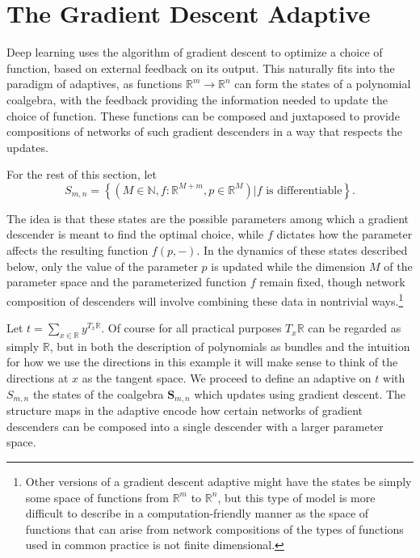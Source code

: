 \documentclass[11pt, one side, article]{memoir}
\theoremstyle{definition}
\theoremstyle{plain}
\newenvironment{definition}
  {\pushQED{\qed}\renewcommand{\qedsymbol}{$\lozenge$}\definitionx}
  {\popQED\enddefinitionx}
\newcommand{\Cat}[1]{\mathbf{#1}}%
\newcommand{\nn}{\mathbb{N}}
\newcommand{\rr}{\mathbb{R}}
\newcommand{\0}{\textsf{0}}
\newcommand{\1}{\tn{\textsf{1}}}
\renewcommand{\S}{{\Cat{S}}}
\begin{document}
\section{The Gradient Descent Adaptive}

Deep learning uses the algorithm of gradient descent to optimize a choice of function, based on external feedback on its output. This naturally fits into the paradigm of adaptives, as functions $\rr^m \to \rr^n$ can form the states of a polynomial coalgebra, with the feedback providing the information needed to update the choice of function. These functions can be composed and juxtaposed to provide compositions of networks of such gradient descenders in a way that respects the updates.

\begin{definition}
For the rest of this section, let 
\[S_{m,n} = \left\{(M \in \nn, f : \rr^{M+m}, p \in \rr^M) | f \textrm{ is differentiable}\right\}.
\]
\end{definition}

The idea is that these states are the possible parameters among which a gradient descender is meant to find the optimal choice, while $f$ dictates how the parameter affects the resulting function $f(p,-)$. In the dynamics of these states described below, only the value of the parameter $p$ is updated while the dimension $M$ of the parameter space and the parameterized function $f$ remain fixed, though network composition of descenders will involve combining these data in nontrivial ways.\footnote{Other versions of a gradient descent adaptive might have the states be simply some space of functions from $\rr^m$ to $\rr^n$, but this type of model is more difficult to describe in a computation-friendly manner as the space of functions that can arise from network compositions of the types of functions used in common practice is not finite dimensional.}%


Let $t = \sum_{x \in \rr} y^{T_x \rr}$.  Of course for all practical purposes $T_x \rr$ can be regarded as simply $\rr$, but in both the description of polynomials as bundles and the intuition for how we use the directions in this example it will make sense to think of the directions at $x$ as the tangent space. We proceed to define an adaptive on $t$ with $S_{m,n}$ the states of the coalgebra $\S_{m,n}$ which updates using gradient descent. The structure maps in the adaptive encode how certain networks of gradient descenders can be composed into a single descender with a larger parameter space.
\end{document}
